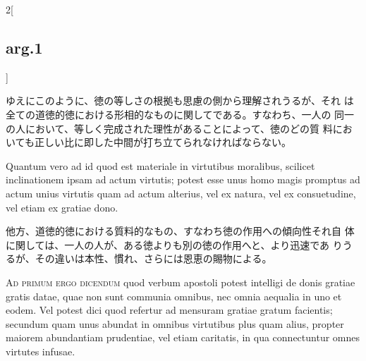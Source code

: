 \documentclass[paper=a4paper,fontsize=10pt,jafontsize=9pt,titlepage]{jlreq}
\begin{document}
\begin{paracol}{2}[\subsection{arg.1}]
\switchcolumn

ゆえにこのように、徳の等しさの根拠も思慮の側から理解されうるが、それ
 は全ての道徳的徳における形相的なものに関してである。すなわち、一人の
 同一の人において、等しく完成された理性があることによって、徳のどの質
 料においても正しい比に即した中間が打ち立てられなければならない。

\switchcolumn*

Quantum vero ad id quod est materiale in virtutibus moralibus,
 scilicet inclinationem ipsam ad actum virtutis; potest esse unus homo
 magis promptus ad actum unius virtutis quam ad actum alterius, vel ex
 natura, vel ex consuetudine, vel etiam ex gratiae dono.

\switchcolumn

他方、道徳的徳における質料的なもの、すなわち徳の作用への傾向性それ自
 体に関しては、一人の人が、ある徳よりも別の徳の作用へと、より迅速であ
 りうるが、その違いは本性、慣れ、さらには恩恵の賜物による。

\switchcolumn*[\subsection{ad.1}]

{\scshape Ad primum ergo dicendum} quod verbum apostoli potest
intelligi de donis gratiae gratis datae, quae non sunt communia
omnibus, nec omnia aequalia in uno et eodem. Vel potest dici quod
refertur ad mensuram gratiae gratum facientis; secundum quam unus
abundat in omnibus virtutibus plus quam alius, propter maiorem
abundantiam prudentiae, vel etiam caritatis, in qua connectuntur omnes
virtutes infusae.

\switchcolumn


\end{paracol}
\end{document}
